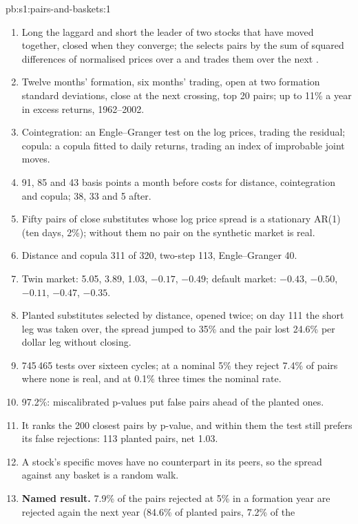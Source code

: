 \begin{solution}{pb:s1:pairs-and-baskets:1}
\begin{enumerate}
\item Long the laggard and short the leader of two stocks that have moved together, closed when they converge; the  selects pairs by the sum of
squared differences of normalised prices over a  and trades them over the next .
\item Twelve months' formation, six months' trading, open at two formation standard deviations, close at the next crossing, top 20 pairs; up to 11\% a year in
excess returns, 1962--2002.
\item Cointegration: an Engle--Granger test on the log prices, trading the residual; copula: a copula fitted to daily returns, trading an index of improbable
joint moves.
\item 91, 85 and 43 basis points a month before costs for distance, cointegration and copula; 38, 33 and 5 after.
\item Fifty pairs of close substitutes whose log price spread is a stationary AR(1) (ten days, 2\%); without them no pair on the synthetic market is real.
\item Distance and copula 311 of 320, two-step 113, Engle--Granger 40.
\item Twin market: 5.05, 3.89, 1.03, $-0.17$, $-0.49$; default market: $-0.43$, $-0.50$, $-0.11$, $-0.47$, $-0.35$.
\item Planted substitutes selected by distance, opened twice; on day 111 the short leg was taken over, the spread jumped to 35\% and the pair lost 24.6\% per
dollar leg without closing.
\item 745\,465 tests over sixteen cycles; at a nominal 5\% they reject 7.4\% of pairs where none is real, and at 0.1\% three times the nominal rate.
\item 97.2\%: miscalibrated p-values put false pairs ahead of the planted ones.
\item It ranks the 200 closest pairs by p-value, and within them the test still prefers its false rejections: 113 planted pairs, net 1.03.
\item A stock's specific moves have no counterpart in its peers, so the spread against any basket is a random walk.
\item \textbf{Named result.} 7.9\% of the pairs rejected at 5\% in a formation year are rejected again the next year (84.6\% of planted pairs, 7.2\% of the

\end{enumerate}
\end{solution}
